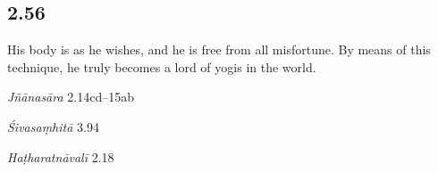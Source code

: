 \begin{ekdosis}

\subsection*{2.56}
\begin{translation}[hp02_056]
His body is as he wishes, and he is free from all misfortune. By means of this technique, he truly becomes a lord of yogis in the world.
\end{translation}

\begin{sources}[hp02_056]
\emph{Jñānasāra} 2.14cd–15ab

\begin{versinnote}
\end{versinnote}

\emph{Śivasaṃhitā} 3.94
\begin{versinnote}
\end{versinnote}
\end{sources}

\begin{testimonia}[hp02_056]
\emph{Haṭharatnāvalī} 2.18 

\begin{versinnote}
\tl{\var{°dehas tu ] °dehaḥ syāt P; °dehasyāt T,t1}\\!}
\end{versinnote}


\end{testimonia}
\end{ekdosis}
